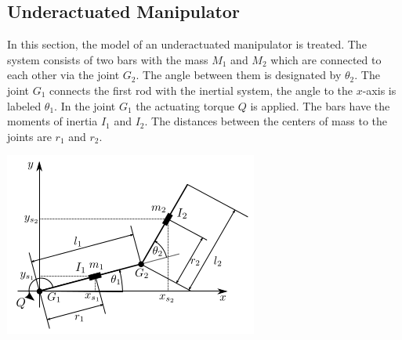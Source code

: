 \documentclass[letterpaper,10pt,english]{sphinxmanual}
\begin{document}
\subsection{Underactuated Manipulator}
\label{guide/examples/uact_manipulator::doc}\label{guide/examples/uact_manipulator:underactuated-manipulator}
In this section, the model of an underactuated manipulator is treated.
The system consists of two bars with the mass \(M_1\) and
\(M_2\) which are connected to each other via the joint \(G_2\).
The angle between them is designated by \(\theta_2\). The joint
\(G_1\) connects the first rod with the inertial system, the angle
to the \(x\)-axis is labeled \(\theta_1\).
In the joint \(G_1\) the actuating torque \(Q\) is applied. The
bars have the moments of inertia \(I_1\) and \(I_2\). The
distances between the centers of mass to the joints are \(r_1\) and
\(r_2\).

\includegraphics{uact_manipulator.png}
\end{document}
